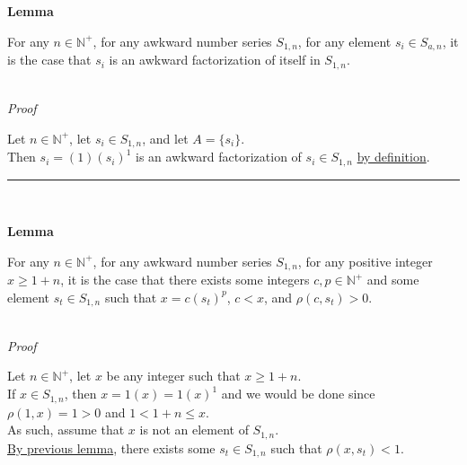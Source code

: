 \documentclass[a4paper,12pt]{article}
\begin{document}
\label{lemma:awkward_factorization_of_element}
\hypertarget{lemma:awkward_factorization_of_element}{}
\begin{tcolorbox}
\textbf{Lemma}

For any $n \in \mathbb{N}^+$, for any awkward number series $S_{1,n}$, for any element $s_i \in S_{a, n}$, it is the case that $s_i$ is an awkward factorization of itself in $S_{1, n}$.
\end{tcolorbox}

\noindent \\
\textit{Proof}

\noindent Let $n \in \mathbb{N}^+$, let $s_i \in S_{1, n}$, and let $A = \{s_i\}$.\\

\noindent Then $s_i = (1)(s_i)^1$ is an awkward factorization of $s_i \in S_{1, n}$ \hyperlink{definition:awkward_factorization}{by definition}.


\begin{center}
\noindent\rule{8cm}{0.4pt}
\end{center}
\noindent \\




\label{lemma:non_common_factorization}
\hypertarget{lemma:non_common_factorization}{}
\begin{tcolorbox}
\textbf{Lemma}

For any $n \in \mathbb{N}^+$, for any awkward number series $S_{1,n}$, for any positive integer $x \geq 1 + n$, it is the case that there exists some integers $c, p \in \mathbb{N}^+$ and some element $s_t \in S_{1, n}$ such that $x = c(s_t)^p$, $c < x$, and $\rho(c, s_t) > 0$.

\end{tcolorbox}

\noindent \\
\textit{Proof}

\noindent Let $n \in \mathbb{N}^+$, let $x$ be any integer such that $x \geq 1 + n$.\\

\noindent If $x \in S_{1, n}$, then $x = 1(x) = 1(x)^1$ and we would be done since $\rho(1, x) = 1 > 0$ and $1 < 1 + n \leq x$.\\

\noindent As such, assume that $x$ is not an element of $S_{1, n}$.\\

\noindent \noindent \hyperlink{lemma:exists_element_less_than_x}{By previous lemma}, there exists some $s_t \in S_{1, n}$ such that $\rho(x, s_t) < 1$.\\
\end{document}
